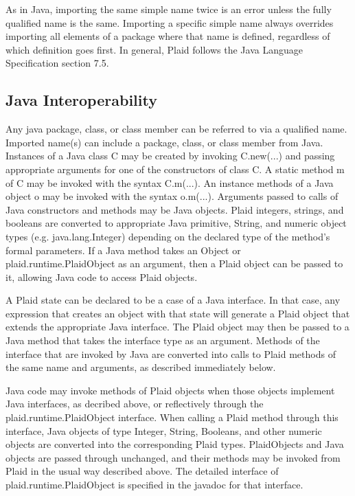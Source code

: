 As in Java, importing the same simple name twice is an error unless
the fully qualified name is the same.  Importing a specific simple
name always overrides importing all elements of a package where
that name is defined, regardless of which definition goes first.
In general, Plaid follows the Java Language Specification section
7.5.


\subsection{Java Interoperability}

  Any java package, class, or
class member can be referred to via a qualified name.  Imported
name(s) can include a package, class, or class member from Java.
Instances of a Java class C may be created by invoking C.new(...)  and
passing appropriate arguments for one of the constructors of class C.
A static method m of C may be invoked with the syntax C.m(...).  An
instance methods of a Java object o may be invoked with the syntax
o.m(...).  Arguments passed to calls of Java constructors and methods
may be Java objects.  Plaid integers, strings, and booleans are
converted to appropriate Java primitive, String, and numeric object
types (e.g. java.lang.Integer) depending on the declared type of the
method's formal parameters.  If a Java method takes an Object or
plaid.runtime.PlaidObject as an argument, then a Plaid object can be
passed to it, allowing Java code to access Plaid objects.

  A Plaid state can be declared to
be a case of a Java interface.  In that case, any 
expression that creates an object with that state will generate a
Plaid object that extends the appropriate Java interface.  The Plaid
object may then be passed to a Java method that takes the interface
type as an argument.  Methods of the interface that are invoked by
Java are converted into calls to Plaid methods of the same name and
arguments, as described immediately below.

  Java code may invoke methods of
Plaid objects when those objects implement Java interfaces, as
decribed above, or reflectively through the plaid.runtime.PlaidObject
interface.  When calling a Plaid method through this interface, Java
objects of type Integer, String, Booleans, and other numeric objects
are converted into the corresponding Plaid types.  PlaidObjects and
Java objects are passed through unchanged, and their methods may be
invoked from Plaid in the usual way described above.  The detailed
interface of plaid.runtime.PlaidObject is specified in the javadoc
for that interface.

